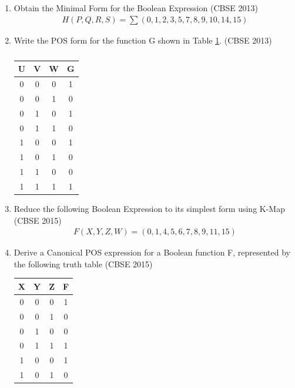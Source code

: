 \begin{enumerate}
	\item 		Obtain the Minimal Form for the Boolean Expression
\label{prob:2013/d/6/d}
\hfill (CBSE 2013)
		\begin{align}
\label{eq:2013/d/6/d}
H(P,Q,R,S)=\sum(0,1,2,3,5,7,8,9,10,14,15)
		\end{align}
	\item Write the POS form for the function G shown in Table
\ref{tab:2013/c/6/d}.
\label{prob:2013/c/6/d}
\hfill (CBSE 2013)

		\begin{table}[!ht]
			\centering
		\begin{tabular}{ |c |c |c |c |}
 \hline
 U  &  V  &  W  &  G\\
 \hline
 0  &  0  &  0  &  1\\
 \hline
 0  &  0  &  1  &  0\\
 \hline
 0  &  1  &  0  &  1\\
 \hline
 0  &  1  &  1  &  0\\
 \hline
 1  &  0  &  0  &  1\\
 \hline
 1  &  0  &  1  &  0\\
 \hline
 1  &  1  &  0  &  0\\
 \hline
 1  &  1  &  1  &  1\\
 \hline
 \end{tabular}
			\caption{}
\label{tab:2013/c/6/d}
 \end{table}
	\item Reduce the following Boolean Expression to its simplest form using K-Map 
\label{prob:2015-1/c/6/d}
\hfill (CBSE 2015)
		\begin{align}
\label{eq:2015-1/c/6/d}
			F(X,Y,Z,W)=(0,1,4,5,6,7,8,9,11,15)
		\end{align}
	\item 
		Derive a Canonical POS expression for a Boolean function F, represented by the following truth table 
\label{prob:2015-1/c/6/c}
\hfill (CBSE 2015)
		\begin{table}[!ht]
			\centering
		\begin{tabular}{|c|c|c|c|}
	\hline
X & Y & Z & F \\
\hline
0 & 0 & 0 & 1 \\  
\hline
0 & 0 & 1 & 0 \\ 
\hline
0 & 1 & 0 & 0 \\
\hline
0 & 1 & 1 & 1 \\
\hline
1 & 0 & 0 & 1 \\  
\hline
1 & 0 & 1 & 0 \\ 

\end{tabular}
\end{table}
\end{enumerate}
